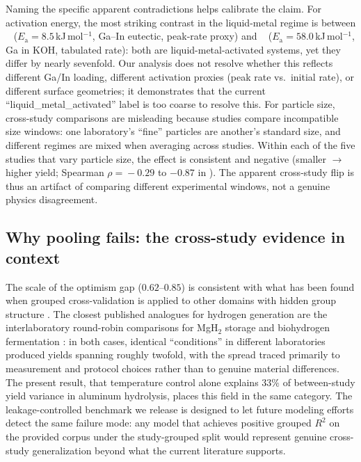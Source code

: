 Naming the specific apparent contradictions helps calibrate the claim. For activation
energy, the most striking contrast in the liquid-metal regime is between
\citeauthor{ilyukhina2012}~\citep{ilyukhina2012} ($E_\mathrm{a}\!=\!8.5$\,kJ\,mol$^{-1}$,
Ga--In eutectic, peak-rate proxy) and \citeauthor{dudoladov2016}~\citep{dudoladov2016}
($E_\mathrm{a}\!=\!58.0$\,kJ\,mol$^{-1}$, Ga in KOH, tabulated rate): both are
liquid-metal-activated systems, yet they differ by nearly sevenfold. Our analysis does
not resolve whether this reflects different Ga/In loading, different activation proxies
(peak rate vs.\ initial rate), or different surface geometries; it demonstrates that the
current ``liquid\_metal\_activated'' label is too coarse to resolve this.
For particle size, cross-study comparisons are misleading because studies compare
incompatible size windows: one laboratory's ``fine'' particles are another's standard
size, and different regimes are mixed when averaging across studies. Within each of the
five studies that vary particle size, the effect is consistent and negative (smaller
$\rightarrow$ higher yield; Spearman $\rho\!=\!-0.29$ to $-0.87$ in
\citep{zhang2024,prabu2021,wen2018,porciuncula2012,deng2010}). The apparent cross-study flip is
thus an artifact of comparing different experimental windows, not a genuine physics
disagreement.

\subsection{Why pooling fails: the cross-study evidence in context}

The scale of the optimism gap ($0.62$--$0.85$) is consistent with what has been found
when grouped cross-validation is applied to other domains with hidden group structure
\citep{bernett2024,john2025}. The closest published analogues for hydrogen generation
are the interlaboratory round-robin comparisons for MgH$_2$ storage \citep{wulf2021} and
biohydrogen fermentation \citep{hoque2018}: in both cases, identical ``conditions'' in
different laboratories produced yields spanning roughly twofold, with the spread traced
primarily to measurement and protocol choices rather than to genuine material differences.
The present result, that temperature control alone explains $33\%$ of between-study
yield variance in aluminum hydrolysis, places this field in the same category. The
leakage-controlled benchmark we release is designed to let future modeling efforts detect
the same failure mode: any model that achieves positive grouped $R^2$ on the provided
corpus under the study-grouped split would represent genuine cross-study generalization
beyond what the current literature supports.

